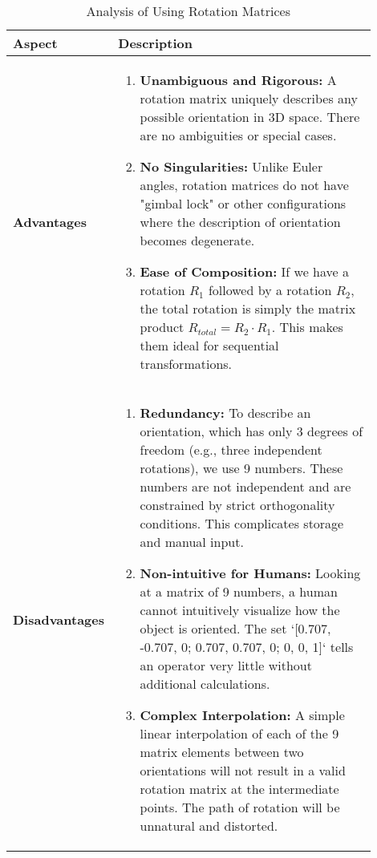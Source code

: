 \begin{table}[h!]
    \caption{Analysis of Using Rotation Matrices}
    \label{tab:rotation_matrix_analysis}
    \centering
    \renewcommand{\arraystretch}{1.2}
    \begin{tabular}{p{0.2\linewidth} p{0.7\linewidth}} %
        \toprule %
        \textbf{Aspect} & \textbf{Description} \\
        \toprule %
        \textbf{Advantages} &
        \vspace{-20pt} %
        \begin{enumerate}
            \item \textbf{Unambiguous and Rigorous:} A rotation matrix uniquely describes any possible orientation in 3D space. There are no ambiguities or special cases.
            \item \textbf{No Singularities:} Unlike Euler angles, rotation matrices do not have "gimbal lock" or other configurations where the description of orientation becomes degenerate.
            \item \textbf{Ease of Composition:} If we have a rotation $R_1$ followed by a rotation $R_2$, the total rotation is simply the matrix product $R_{total} = R_2 \cdot R_1$. This makes them ideal for sequential transformations.
        \end{enumerate}
        \vspace{-20pt} %
        \\
        \midrule %
        \textbf{Disadvantages} &
        \vspace{-18pt} %
        \begin{enumerate}
            \item \textbf{Redundancy:} To describe an orientation, which has only 3 degrees of freedom (e.g., three independent rotations), we use 9 numbers. These numbers are not independent and are constrained by strict orthogonality conditions. This complicates storage and manual input.
            \item \textbf{Non-intuitive for Humans:} Looking at a matrix of 9 numbers, a human cannot intuitively visualize how the object is oriented. The set `[0.707, -0.707, 0; 0.707, 0.707, 0; 0, 0, 1]` tells an operator very little without additional calculations.
            \item \textbf{Complex Interpolation:} A simple linear interpolation of each of the 9 matrix elements between two orientations will not result in a valid rotation matrix at the intermediate points. The path of rotation will be unnatural and distorted.
        \end{enumerate}
        \vspace{-20pt} %
        \\
        \bottomrule %
    \end{tabular}
\end{table}

